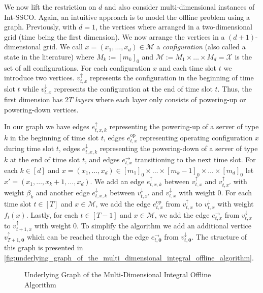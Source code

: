We now lift the restriction on $d$ and also consider multi-dimensional instances of Int-SSCO. Again, an intuitive approach is to model the offline problem using a graph. Previously, with $d = 1$, the vertices where arranged in a two-dimensional grid (time being the first dimension). We now arrange the vertices in a $(d+1)$-dimensional grid. We call $x = (x_1, \dots, x_d) \in \mathcal{M}$ a \emph{configuration} (also called a state in the literature) where $M_k := [m_k]_0$ and $\mathcal{M} := M_1 \times \dots \times M_d = \mathcal{X}$ is the set of all configurations. For each configuration $x$ and each time slot $t$ we introduce two vertices. $v_{t,x}^{\uparrow}$ represents the configuration in the beginning of time slot $t$ while $v_{t,x}^{\downarrow}$ represents the configuration at the end of time slot $t$. Thus, the first dimension has $2 T$ \emph{layers} where each layer only consists of powering-up or powering-down vertices.

In our graph we have edges $e_{t,x,k}^{\uparrow}$ representing the powering-up of a server of type $k$ in the beginning of time slot $t$, edges $e_{t,x}^{\text{op}}$ representing operating configuration $x$ during time slot $t$, edges $e_{t,x,k}^{\downarrow}$ representing the powering-down of a server of type $k$ at the end of time slot $t$, and edges $e_{t,x}^{\rightarrow}$ transitioning to the next time slot. For each $k \in [d]$ and $x = (x_1, \dots, x_d) \in [m_1]_0 \times \dots \times [m_k - 1]_0 \times \dots \times [m_d]_0$ let $x' = (x_1, \dots, x_k + 1, \dots, x_d)$. We add an edge $e_{t,x,k}^{\uparrow}$ between $v_{t,x}^{\uparrow}$ and $v_{t,x'}^{\uparrow}$ with weight $\beta_k$ and another edge $e_{t,x,k}^{\downarrow}$ between $v_{t,x'}^{\downarrow}$ and $v_{t,x}^{\downarrow}$ with weight $0$. For each time slot $t \in [T]$ and $x \in \mathcal{M}$, we add the edge $e_{t,x}^{\text{op}}$ from $v_{t,x}^{\uparrow}$ to $v_{t,x}^{\downarrow}$ with weight $f_t(x)$. Lastly, for each $t \in [T-1]$ and $x \in \mathcal{M}$, we add the edge $e_{t,x}^{\rightarrow}$ from $v_{t,x}^{\downarrow}$ to $v_{t+1,x}^{\uparrow}$ with weight $0$.  To simplify the algorithm we add an additional vertice $v_{T+1,\mathbf{0}}^{\uparrow}$ which can be reached through the edge $e_{t,\mathbf{0}}^{\rightarrow}$ from $v_{t,\mathbf{0}}^{\downarrow}$. The structure of this graph is presented in \autoref{fig:underlying_graph_of_the_multi_dimensional_integral_offline_algorithm}.

\begin{figure}
    \centering
    [TODO]
    \caption{Underlying Graph of the Multi-Dimensional Integral Offline Algorithm}
    \label{fig:underlying_graph_of_the_multi_dimensional_integral_offline_algorithm}
\end{figure}


